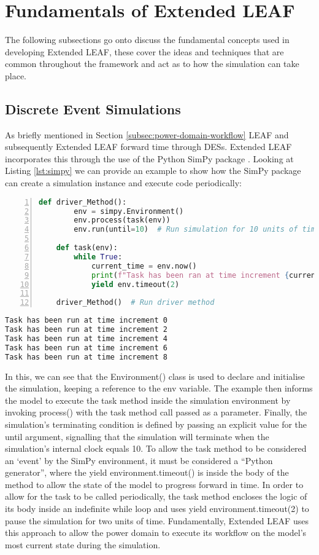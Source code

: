 \documentclass{l4proj}
\begin{document}
\section{Fundamentals of Extended LEAF}
The following subsections go onto discuss the fundamental concepts used in developing Extended LEAF, these cover the ideas and techniques that are common throughout the framework and act as to how the simulation can take place.

\subsection{Discrete Event Simulations}\label{imp:subsec:des}
As briefly mentioned in Section \ref{subsec:power-domain-workflow} LEAF and subsequently Extended LEAF forward time through DESs.
Extended LEAF incorporates this through the use of the Python SimPy package \cite{simpy}.
Looking at Listing \ref{lst:simpy} we can provide an example to show how the SimPy package can create a simulation instance and execute code periodically:
\begin{lstlisting}[language=python, numbers=left, caption={Example use of the SimPy environment}, label=lst:simpy]
    def driver_Method():
        env = simpy.Environment()
        env.process(task(env))
        env.run(until=10)  # Run simulation for 10 units of time

    def task(env):
        while True:
            current_time = env.now()
            print(f"Task has been ran at time increment {current_time}")
            yield env.timeout(2)

    driver_Method()  # Run driver method
\end{lstlisting}
\begin{lstlisting}[language=TeX, caption={Terminal output of Listing \ref{lst:simpy}}, label=lst:simpy-output]
Task has been run at time increment 0
Task has been run at time increment 2
Task has been run at time increment 4
Task has been run at time increment 6
Task has been run at time increment 8
\end{lstlisting}

In this, we can see that the Environment() class is used to declare and initialise the simulation, keeping a reference to the env variable.
The example then informs the model to execute the task method inside the simulation environment by invoking process() with the task method call passed as a parameter.
Finally, the simulation's terminating condition is defined by passing an explicit value for the until argument, signalling that the simulation will terminate when the simulation's internal clock equals 10.
To allow the task method to be considered an `event' by the SimPy environment, it must be considered a ``Python generator'', where the yield environment.timeout() is inside the body of the method to allow the state of the model to progress forward in time.
In order to allow for the task to be called periodically, the task method encloses the logic of its body inside an indefinite while loop and uses yield environment.timeout(2) to pause the simulation for two units of time.
Fundamentally, Extended LEAF uses this approach to allow the power domain to execute its workflow on the model's most current state during the simulation.
\end{document}
